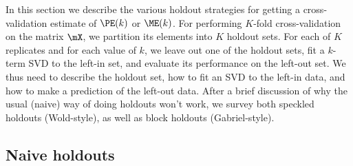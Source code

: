 In this section we describe the various holdout strategies for getting a
cross-validation estimate of $\PE(k)$ or $\ME(k)$. For performing $K$-fold
cross-validation on the matrix $\mX$, we partition its elements into $K$
holdout sets. For each of $K$ replicates and for each value of $k$, we leave
out one of the holdout sets, fit a $k$-term SVD to the left-in set, and
evaluate its performance on the left-out set. We thus need to describe the
holdout set, how to fit an SVD to the left-in data, and how to make a
prediction of the left-out data. After a brief discussion of why the usual
(naive) way of doing holdouts won't work, we survey both speckled holdouts
(Wold-style), as well as block holdouts (Gabriel-style).

\subsection{Naive holdouts}

